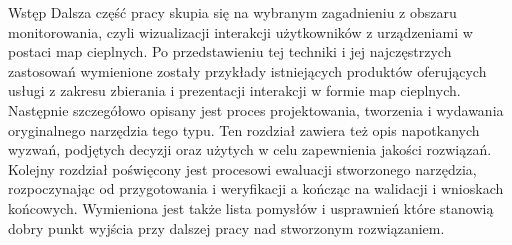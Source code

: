 \begin{chapter}{Wstęp}
	Dalsza część pracy skupia się na wybranym zagadnieniu z obszaru monitorowania, czyli wizualizacji interakcji użytkowników z urządzeniami w postaci map cieplnych. Po przedstawieniu tej techniki i jej najczęstrzych zastosowań wymienione zostały przykłady istniejących produktów oferujących usługi z zakresu zbierania i prezentacji interakcji w formie map cieplnych. Następnie szczegółowo opisany jest proces projektowania, tworzenia i wydawania oryginalnego narzędzia tego typu. Ten rozdział zawiera też opis napotkanych wyzwań, podjętych decyzji oraz użytych w celu zapewnienia jakości rozwiązań. Kolejny rozdział poświęcony jest procesowi ewaluacji stworzonego narzędzia, rozpoczynając od przygotowania i weryfikacji a kończąc na walidacji i wnioskach końcowych. Wymieniona jest także lista pomysłów i usprawnień które stanowią dobry punkt wyjścia przy dalszej pracy nad stworzonym rozwiązaniem.
\end{chapter}

